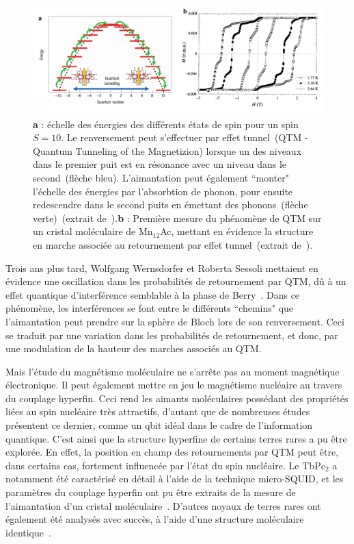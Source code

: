 \begin{figure}
\centering \includegraphics[scale=0.45]{Spintronique/MolecularMag/MolecularMag.pdf}
\caption{ \textbf{a} : échelle des énergies des différents états de spin pour un spin $S=10$. Le renversement peut s'effectuer par effet tunnel~(QTM - Quantum Tunneling of the Magnetizion) lorsque un des niveaux dans le premier puit est en résonance avec un niveau dans le second~(flèche bleu). L'aimantation peut également ``monter" l'échelle des énergies par l'absorbtion de phonon, pour ensuite redescendre dans le second puits en émettant des phonons~(flèche verte)~(extrait de~\cite{Bogani2008}).\textbf{b} : Première mesure du phénomène de QTM sur un cristal moléculaire de Mn$_{12}$Ac, mettant en évidence la structure en marche associée au retournement par effet tunnel~(extrait de~\cite{Thomas1996}).}
\label{MolecularMag}
\end{figure}

Trois ans plus tard, Wolfgang Wernsdorfer et Roberta Sessoli mettaient en évidence une oscillation dans les probabilités de retournement par QTM, dû à un effet quantique d'interférence semblable à la phase de Berry~\cite{Wernsdorfer1999}. Dans ce phénomène, les interférences se font entre le différents ``chemins" que l’aimantation peut prendre sur la sphère de Bloch lors de son renversement. Ceci se traduit par une variation dans les probabilités de retournement, et donc, par une modulation de la hauteur des marches associés au QTM.

Mais l'étude du magnétisme moléculaire ne s'arr\^ete pas au moment magnétique électronique. Il peut également mettre en jeu le magnétisme nucléaire au travers du couplage hyperfin. Ceci rend les aimants moléculaires possédant des propriétés liées au spin nucléaire très attractifs, d'autant que de nombreuses études présentent ce dernier, comme un qbit idéal dans le cadre de l'information quantique. C'est ainsi que la structure hyperfine de certains terres rares a pu être explorée. En effet, la position en champ des retournements par QTM peut être, dans certains cas, fortement influencée par l'état du spin nucléaire. Le TbPc$_{2}$ a notamment été caractérisé en détail à l'aide de la technique micro-SQUID, et les paramètres du couplage hyperfin ont pu être extraits de la mesure de l'aimantation d'un cristal moléculaire~\cite{Ishikawa2005}. D'autres noyaux de terres rares ont également été analysés avec succès, à l'aide d'une structure moléculaire identique~\cite{Ishikawa2005a}.

